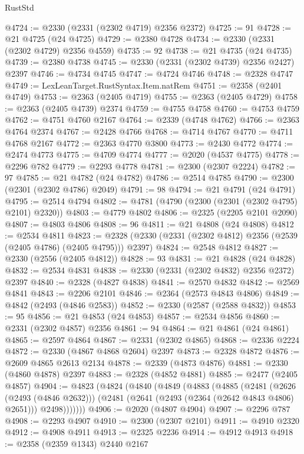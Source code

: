 \begin{lexlean}{RustStd}
\begin{coremodule}
@4724 := @2330 (@2331 (@2302 @4719) @2356 @2372)
@4725 := 91
@4728 := @21 @4725 (@24 @4725)
@4729 := @2380 @4728
@4734 := @2330 (@2331 (@2302 @4729) @2356 @4559)
@4735 := 92
@4738 := @21 @4735 (@24 @4735)
@4739 := @2380 @4738
@4745 := @2330 (@2331 (@2302 @4739) @2356 @2427) @2397
@4746 := @4734 @4745
@4747 := @4724 @4746
@4748 := @2328 @4747
@4749 := LexLeanTarget.RustSyntax.Item.natRem
@4751 := @2358 (@2401 @4749)
@4753 := @2363 (@2405 @4719)
@4755 := @2363 (@2405 @4729)
@4758 := @2363 (@2405 @4739) @2374
@4759 := @4755 @4758
@4760 := @4753 @4759
@4762 := @4751 @4760 @2167
@4764 := @2339 (@4748 @4762)
@4766 := @2363 @4764 @2374
@4767 := @2428 @4766
@4768 := @4714 @4767
@4770 := @4711 @4768 @2167
@4772 := @2363 @4770 @3800
@4773 := @2430 @4772
@4774 := @2474 @4773
@4775 := @4709 @4774
@4777 := @2020 (@4537 @4775)
@4778 := @2296 @782
@4779 := @2293 @4778
@4781 := @2300 (@2307 @2224)
@4782 := 97
@4785 := @21 @4782 (@24 @4782)
@4786 := @2514 @4785
@4790 := @2300 (@2301 (@2302 @4786) @2049)
@4791 := 98
@4794 := @21 @4791 (@24 @4791)
@4795 := @2514 @4794
@4802 := @4781 (@4790 (@2300 (@2301 (@2302 @4795) @2101) @2320))
@4803 := @4779 @4802
@4806 := @2325 (@2205 @2101 @2090)
@4807 := @4803 @4806
@4808 := 96
@4811 := @21 @4808 (@24 @4808)
@4812 := @2534 @4811
@4823 := @2328 (@2330 (@2331 (@2302 @4812) @2356 (@2539 (@2405 @4786) (@2405 @4795))) @2397)
@4824 := @2548 @4812
@4827 := @2330 (@2556 (@2405 @4812))
@4828 := 93
@4831 := @21 @4828 (@24 @4828)
@4832 := @2534 @4831
@4838 := @2330 (@2331 (@2302 @4832) @2356 @2372) @2397
@4840 := @2328 (@4827 @4838)
@4841 := @2570 @4832
@4842 := @2569 @4841
@4843 := @2206 @2101
@4846 := @2364 (@2573 @4843 @4806)
@4849 := @4842 (@2493 (@4846 @2583))
@4852 := @2330 (@2587 (@2588 @4832))
@4853 := 95
@4856 := @21 @4853 (@24 @4853)
@4857 := @2534 @4856
@4860 := @2331 (@2302 @4857) @2356
@4861 := 94
@4864 := @21 @4861 (@24 @4861)
@4865 := @2597 @4864
@4867 := @2331 (@2302 @4865)
@4868 := @2336 @2224
@4872 := @2330 (@4867 @4868 @2604) @2397
@4873 := @2328 @4872
@4876 := @2609 @4865 @2613 @2134
@4878 := @2339 (@4873 @4876)
@4881 := @2330 (@4860 @4878) @2397
@4883 := @2328 (@4852 @4881)
@4885 := @2477 (@2405 @4857)
@4904 := @4823
    (@4824
      (@4840
        (@4849
          (@4883
            (@4885
              (@2481
                (@2626 (@2493 (@4846 @2632)))
                (@2481 (@2641 (@2493 (@2364 (@2642 @4843 @4806) @2651))) @2498)))))))
@4906 := @2020 (@4807 @4904)
@4907 := @2296 @787
@4908 := @2293 @4907
@4910 := @2300 (@2307 @2101)
@4911 := @4910 @2320
@4912 := @4908 @4911
@4913 := @2325 @2236
@4914 := @4912 @4913
@4918 := @2358 (@2359 @1343) @2440 @2167

\end{coremodule}
\end{lexlean}
